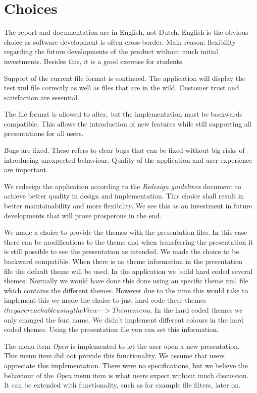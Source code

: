 \documentclass[a4paper]{article}
\begin{document}
\section{Choices}
The report and documentation are in English, not Dutch. English is the obvious choice as software development is often cross-border. Main reason: flexibility regarding the future developments of the product without much initial investments. Besides this, it is a good exercise for students.

Support of the current file format is continued. The application will display the test.xml file correctly as well as files that are in the wild. Customer trust and satisfaction are essential.
 
The file format is allowed to alter, but the implementation must be backwards compatible. This allows the introduction of new features while still supporting all presentations for all users.

Bugs are fixed. These refers to clear bugs that can be fixed without big risks of introducing unexpected behaviour. Quality of the application and user experience are important.

We redesign the application according to the \textit{Redesign guidelines} document to achieve better quality in design and implementation. This choice shall result in better maintainability and more flexibility. We see this as an investment in future developments that will prove prosperous in the end.

We made a choice to provide the themes with the presentation files. In this case there can be modifications to the theme and when transferring the presentation it is still possible to see the presentation as intended. We made the choice to be backward compatible. When there is no theme information in the presentation file the default theme will be used. In the application we build hard coded several themes. Normally we would have done this done using an specific theme xml file which contains the different themes. However due to the time this would take to implement this we made the choice to just hard code these themes \(they are reachable using the View->Theme menu. \) In the hard coded themes we only changed the font name. We didn't implement different colours in the hard coded themes. Using the presentation file you can set this information.

The menu item \textit{Open} is implemented to let the user open a new presentation. This menu item did not provide this functionality. We assume that users appreciate this implementation. There were no specifications, but we believe the behaviour of the \textit{Open} menu item is what users expect without much discussion. It can be extended with functionality, such as for example file filters, later on.
\end{document}
